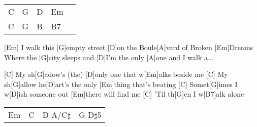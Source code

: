 \begin{guitar}
	{\footnotesize\begin{tabular}{|l|l|l|l|l}
			C & G & D & Em & \optionalChord{(x3)} \\
			C & G & B & B7 & 
	\end{tabular}}
	
	[Em] I walk this [G]empty street [D]on the Boule[A]vard of Broken [Em]Dreams
	Where the [G]city sleeps and [D]I'm the only [A]one and I walk a...
	
	\begin{highlightbar}
		[C] My sh[G]adow's (the) [D]only one that w[Em]alks beside me
		[C] My sh[G]allow he[D]art's the only [Em]thing that's beating
		[C] Somet[G]imes I w[D]ish someone out [Em]there will find me
		[C] 'Til th[G]en I w[B7]alk alone
	\end{highlightbar}
	
	{\footnotesize\begin{tabular}{|l|l|l|l|}
			Em & C & D A/C$\sharp$ & G D$\sharp$5
	\end{tabular} }
\end{guitar}